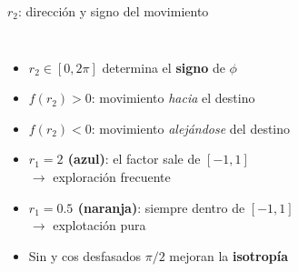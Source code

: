 \documentclass[aspectratio=169]{beamer}
\newcommand{\good}[1]{\textcolor{mygreen}{\textbf{#1}}}
\renewcommand{\accent}[1]{\textcolor{myyellow}{\textbf{#1}}}
\begin{document}
\begin{frame}{$r_2$: dirección y signo del movimiento}
\begin{columns}[T]
      \vspace{0.8em}
      \begin{itemize}
        \item $r_2 \in [0, 2\pi]$ determina el \textbf{signo} de $\phi$
        \vspace{0.3em}
        \item $f(r_2) > 0$: movimiento \textit{hacia} el destino
        \vspace{0.2em}
        \item $f(r_2) < 0$: movimiento \textit{alejándose} del destino
        \vspace{0.4em}
        \item \good{$r_1=2$ (azul)}: el factor sale de $[-1,1]$\\
              $\to$ exploración frecuente
        \vspace{0.3em}
        \item \accent{$r_1=0.5$ (naranja)}: siempre dentro de $[-1,1]$\\
              $\to$ explotación pura
        \vspace{0.4em}
        \item Sin y cos desfasados $\pi/2$ mejoran la \textbf{isotropía}
      \end{itemize}
  \end{columns}
\end{frame}
\end{document}
